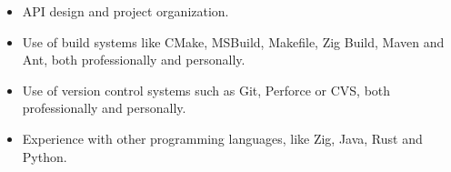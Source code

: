 \begin{itemize}
	\item API design and project organization.
	
	\item Use of build systems like CMake, MSBuild, Makefile, Zig Build, Maven and Ant, both professionally and personally.
	
	\item Use of version control systems such as Git, Perforce or CVS, both professionally and personally.
	
	\item Experience with other programming languages, like Zig, Java, Rust and Python.
\end{itemize}